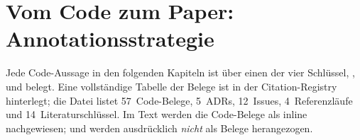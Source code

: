 \section{Vom Code zum Paper: Annotationsstrategie}\label{sec:annotations}

Jede Code-Aussage in den folgenden Kapiteln ist über einen der vier Schlüssel\texttt{}, \texttt{}, \texttt{} und \texttt{} belegt. Eine vollständige Tabelle der Belege ist in der Citation-Registry~\cite{citation-registry} hinterlegt; die Datei listet 57~Code-Belege, 5~ADRs, 12~Issues, 4~Referenzläufe und 14~Literaturschlüssel. Im Text werden die Code-Belege als \texttt{} inline nachgewiesen;  und  werden ausdrücklich \emph{nicht} als Belege herangezogen.